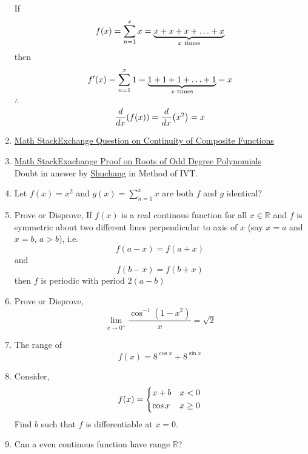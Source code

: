 \documentclass{article}
\begin{document}
\begin{enumerate}
            If $$f(x)=\displaystyle\sum_{n=1}^{x} x=\underbrace{x+x+x+\ldots +x}_{x \hspace{1mm} \text{times}}$$
            then $$f'(x)=\displaystyle\sum_{n=1}^{x} 1=\underbrace{1+1+1+\ldots+1}_{x \hspace{1mm} \text{times}}=x$$
            $\therefore$ $$\dv{x}(f(x))=\dv{x}(x^2)=x$$
      \item \href{https://math.stackexchange.com/questions/4892287/is-this-result-on-continuity-of-composite-functions-true}{Math StackExchange Question on Continuity of Composite Functions}
      \item \href{https://math.stackexchange.com/questions/689575/proof-that-every-polynomial-of-odd-degree-has-one-real-root}{Math StackExachange Proof on Roots of Odd Degree Polynomials } \\ Doubt in answer by  \href{https://math.stackexchange.com/users/91982/shuchang}{Shuchang} in Method of IVT.
      \item Let $f(x)=x^2$ and $g(x)=\displaystyle\sum_{n=1}^{x}x$
            \newline \newline are both $f$ and $g$ identical?
      \item Prove or Disprove,
            If $f(x)$ is a real continous function for all $x \in \mathbb{R}$ and $f$ is symmetric about two different lines perpendicular to axis of $x$ (say $x=a$ and $x=b$, $a>b$), i.e. $$f(a-x)=f(a+x) $$ and $$f(b-x)=f(b+x)$$ then $f$ is periodic with period $2(a-b)$
      \item Prove or Disprove,
            $$\lim\limits_{x \to 0^+}{\dfrac{\cos^{-1} \left(1-x^2\right)}{x}}=\sqrt{2}$$
      \item The range of $$f(x)=8^{\cos x}+8^{\sin x}$$
      \item Consider, $$f(x)=\begin{dcases}
            x+b & x<0 \\
            \cos x & x \ge 0
      \end{dcases}$$
      Find $b$ such that $f$ is differentiable at $x=0$.
      \item Can a even continous function have range $\mathbb{R}$?
\end{enumerate}
\end{document}

